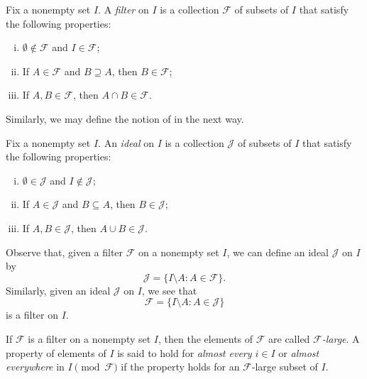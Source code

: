 \documentclass{scrartcl}
\begin{document}
\begin{definition}
\label{D: filter}

Fix a nonempty set $I$. A \emph{filter} on $I$ is a collection $\mathscr{F}$ of subsets of $I$ that satisfy the following properties:

\begin{enumerate}[i)]
        \item $\emptyset\not\in\mathscr{F}$ and $I\in \mathscr{F}$;
        \item If $A\in\mathscr{F}$ and $B\supseteq A$, then $B\in\mathscr{F}$;
        \item If $A,B\in \mathscr{F}$, then $A\cap B\in\mathscr{F}$.
        
    \end{enumerate}
\end{definition}

Similarly, we may define the notion of  in the next way.

\begin{definition}
\label{D: ideal}

Fix a nonempty set $I$. An \emph{ideal} on $I$ is a collection $\mathscr{J}$ of subsets of $I$ that satisfy the following properties:

\begin{enumerate}[i)]
        \item $\emptyset\in\mathscr{J}$ and $I\not\in \mathscr{J}$;
        \item If $A\in\mathscr{J}$ and $B\subseteq A$, then $B\in\mathscr{J}$;
        \item If $A,B\in \mathscr{J}$, then $A\cup B\in\mathscr{J}$.
        
    \end{enumerate}

\end{definition}

Observe that, given a filter $\mathscr{F}$ on a nonempty set $I$, we can define an ideal $\mathscr{J}$ on $I$ by \[\mathscr{J}=\{I\setminus A \colon A\in\mathscr{F}\}\text{.}\]
Similarly, given an ideal $\mathscr{J}$ on $I$, we see that \[\mathscr{F} = \{I\setminus A \colon A\in \mathscr{J}\}\] is a filter on $I$.

\begin{notation}
If $\mathscr{F}$ is a filter on a nonempty set $I$, then the elements of $\mathscr{F}$ are called \emph{$\mathscr{F}$-large}. A property of elements of $I$ is said to hold for \emph{almost every $i\in I$} or \emph{almost everywhere} in $I \pmod{\mathscr{F}}$ if the property holds for an $\mathscr{F}$-large subset of $I$.
\end{notation}
\end{document}
